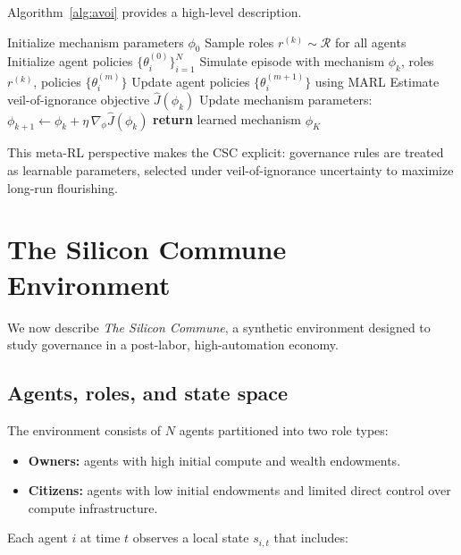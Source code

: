 \documentclass{article}
\begin{document}
Algorithm~\ref{alg:avoi} provides a high-level description.

\begin{algorithm}[t]
\caption{Algorithmic Veil of Ignorance (AVoI) for CSC}
\label{alg:avoi}
\begin{algorithmic}[1]
\STATE Initialize mechanism parameters $\phi_0$
  \STATE Sample roles $r^{(k)} \sim \mathcal{R}$ for all agents
  \STATE Initialize agent policies $\{\theta_i^{(0)}\}_{i=1}^N$
    \STATE Simulate episode with mechanism $\phi_k$, roles $r^{(k)}$, policies $\{\theta_i^{(m)}\}$
    \STATE Update agent policies $\{\theta_i^{(m+1)}\}$ using MARL
  \ENDFOR
  \STATE Estimate veil-of-ignorance objective $\hat{J}(\phi_k)$
  \STATE Update mechanism parameters: $\phi_{k+1} \leftarrow \phi_k + \eta \, \nabla_{\phi} \hat{J}(\phi_k)$
\ENDFOR
\STATE \textbf{return} learned mechanism $\phi_K$
\end{algorithmic}
\end{algorithm}

This meta-RL perspective makes the CSC explicit: governance rules are treated as learnable parameters, selected under veil-of-ignorance uncertainty to maximize long-run flourishing.

\section{The Silicon Commune Environment}
\label{sec:environment}

We now describe \emph{The Silicon Commune}, a synthetic environment designed to study governance in a post-labor, high-automation economy.

\subsection{Agents, roles, and state space}
\label{subsec:agents}

The environment consists of $N$ agents partitioned into two role types:

\begin{itemize}
  \item \textbf{Owners:} agents with high initial compute and wealth endowments.
  \item \textbf{Citizens:} agents with low initial endowments and limited direct control over compute infrastructure.
\end{itemize}

Each agent $i$ at time $t$ observes a local state $s_{i,t}$ that includes:
\end{document}
